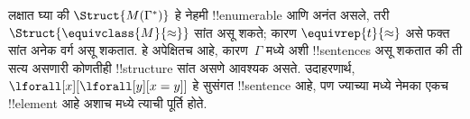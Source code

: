 \documentclass[../../../include/open-logic-section]{subfiles}
\begin{document}
\begin{digress}
लक्षात घ्या की $\Struct{M(\Gamma^*)}$ हे नेहमी !!{enumerable} आणि अनंत
असले, तरी $\Struct{\equivclass{M}{\approx}}$ सांत असू शकते; कारण
$\equivrep{t}{\approx}$ असे फक्त सांत अनेक वर्ग असू शकतात. हे अपेक्षितच
आहे, कारण~$\Gamma$ मध्ये अशी !!{sentence}s असू शकतात की ती सत्य असणारी
कोणतीही !!{structure} सांत असणे आवश्यक असते. उदाहरणार्थ,
$\lforall[x][\lforall[y][x = y]]$ हे सुसंगत !!{sentence} आहे, पण ज्याच्या
मध्ये नेमका एकच !!{element} आहे अशाच मध्ये
त्याची पूर्ति होते.
\end{digress}
\end{document}
